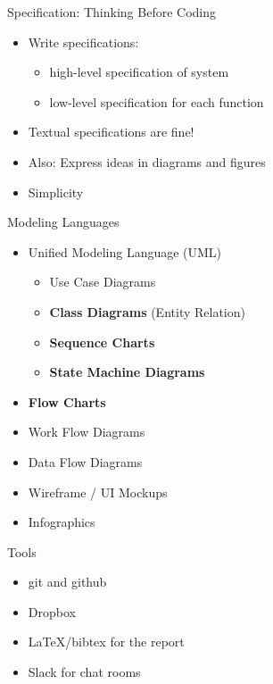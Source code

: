\documentclass[hyperref={pdfpagelabels=false}, aspectratio=1610,handout]{beamer}
\begin{document}
\begin{frame}
\begin{block}{Specification: Thinking Before Coding}
 \begin{itemize}
  \item Write specifications:
  \begin{itemize}
  	\item high-level specification of system
	\item low-level specification for each function
  \end{itemize}
  \item Textual specifications are fine!
  \item Also: Express ideas in diagrams and figures
  \item Simplicity
 \end{itemize}
\end{block}
\end{frame}

\begin{frame}
\begin{block}{Modeling Languages}
 \begin{itemize}
  \item Unified Modeling Language (UML)
  \begin{itemize}
	\item Use Case Diagrams
  	\item \textbf{Class Diagrams} (Entity Relation)
	\item \textbf{Sequence Charts}
	\item \textbf{State Machine Diagrams}
  \end{itemize}
  \item \textbf{Flow Charts}
  \item Work Flow Diagrams
  \item Data Flow Diagrams
  \item Wireframe / UI Mockups
  \item Infographics
 \end{itemize}
\end{block}
\end{frame}

\begin{frame}
\begin{block}{Tools}
 \begin{itemize}
  \item git and github
  \item Dropbox
  \item LaTeX/bibtex for the report
  \item Slack for chat rooms
 \end{itemize}
\end{block}
\end{frame}
\end{document}
